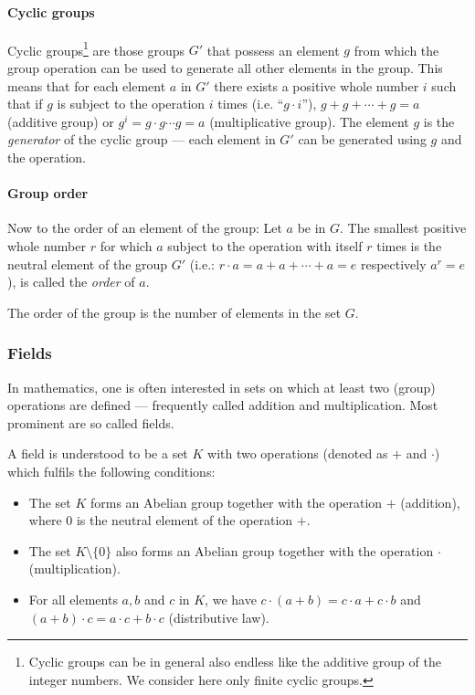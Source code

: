 \paragraph{Cyclic groups}
Cyclic groups\footnote{Cyclic groups can be in general also endless like the additive group of the integer numbers. We consider here only finite cyclic groups.} are those groups $G'$ that possess an element $g$
from which the group operation can be used to generate all other
elements in the group. This means that for each element $a$ in
$G'$ there exists a positive whole number $i$ such that if $g$ is
subject to the operation $i$ times (i.e. ``$g\cdot i$''),
$g+g+\cdots+g = a$ (additive group) or $g^i = g\cdot g \cdots g = a$
(multiplicative group). The element $g$ is the {\em generator} of
the cyclic group --- each element in $G'$ can be generated using
$g$ and the operation.

\paragraph{Group order}
Now to the order of an element of the group: Let $a$ be in $G$. The smallest
positive whole number $r$ for which $a$ subject to the operation with itself $r$
times is the neutral element of the group $G'$ (i.e.: $r \cdot a = a+a+\cdots+a =
e$ respectively $a^r = e$), is called the {\em order} of $a$.

The order of the group is the number of elements in the set $G$.

\subsubsection{Fields}

In mathematics, one is often interested in sets on which at least two (group) operations are defined --- frequently called addition and multiplication. Most prominent are so called fields.

A field is understood to be a set $K$ with two operations
(denoted as $+$ and $\cdot$) which fulfils the following conditions:
\begin{itemize}
   \item The set $K$ forms an Abelian group together with the operation $+$
(addition), where $0$ is the neutral element of the operation $+$.
   \item The set $K\setminus\{ 0\}$ also forms an Abelian group
together with the operation $\cdot$ (multiplication).
   \item For all elements $a, b$ and $c$ in $K$, we have $c\cdot (a+b) = c \cdot a + c
\cdot b$ and $(a+b) \cdot c = a \cdot c + b \cdot c$ (distributive law).
\end{itemize}

